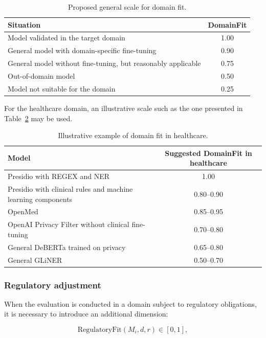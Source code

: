 \documentclass[11pt,a4paper]{article}
\begin{document}
\begin{table}[h!]
\centering
\caption{Proposed general scale for domain fit.}
\label{tab:domainfit_general}
\begin{tabular}{lc}
\toprule
\textbf{Situation} & \textbf{DomainFit} \\
\midrule
Model validated in the target domain & 1.00 \\
General model with domain-specific fine-tuning & 0.90 \\
General model without fine-tuning, but reasonably applicable & 0.75 \\
Out-of-domain model & 0.50 \\
Model not suitable for the domain & 0.25 \\
\bottomrule
\end{tabular}
\end{table}

For the healthcare domain, an illustrative scale such as the one presented in Table~\ref{tab:domainfit_health} may be used.

\begin{table}[h!]
\centering
\caption{Illustrative example of domain fit in healthcare.}
\label{tab:domainfit_health}
\begin{tabular}{lc}
\toprule
\textbf{Model} & \textbf{Suggested DomainFit in healthcare} \\
\midrule
Presidio with REGEX and NER & 1.00 \\
Presidio with clinical rules and machine learning components & 0.80--0.90 \\
OpenMed   & 0.85--0.95 \\
OpenAI Privacy Filter without clinical fine-tuning & 0.70--0.80 \\
General DeBERTa trained on privacy & 0.65--0.80 \\
General GLiNER & 0.50--0.70 \\
\bottomrule
\end{tabular}
\end{table}

\subsubsection{Regulatory adjustment}

When the evaluation is conducted in a domain subject to regulatory obligations, it is necessary to introduce an additional dimension:

\begin{equation}
    \mathrm{RegulatoryFit}(M_i,d,r)\in[0,1],
\end{equation}
\end{document}
